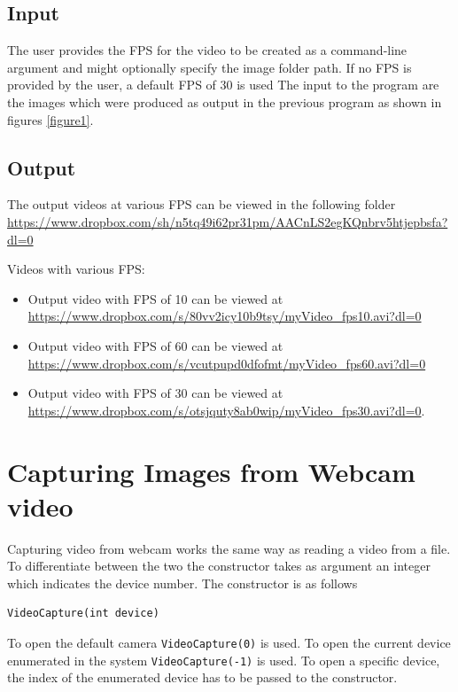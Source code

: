 \documentclass[12pt]{article}
\begin{document}
\subsection{Input}
The user provides the FPS for the video to be created as a command-line argument and might optionally specify the image folder path. If no FPS is provided by the user, a default FPS of 30 is used
The input to the program are the images which were produced as output in the previous program as shown in figures \ref{figure1}.

\subsection{Output}
The output videos at various FPS can be viewed in the following folder \url{https://www.dropbox.com/sh/n5tq49i62pr31pm/AACnLS2egKQnbrv5htjepbsfa?dl=0} 

Videos with various FPS:
\begin{itemize}
\item Output video with FPS of 10 can be viewed at \url{https://www.dropbox.com/s/80vv2icy10b9tsy/myVideo_fps10.avi?dl=0} 
\item Output video with FPS of 60 can be viewed at \url{https://www.dropbox.com/s/vcutpupd0dfofmt/myVideo_fps60.avi?dl=0}
\item Output video with FPS of 30 can be viewed at \url{https://www.dropbox.com/s/otsjquty8ab0wip/myVideo_fps30.avi?dl=0}.
\end{itemize}


\section{Capturing Images from Webcam video}
Capturing video from webcam works the same way as reading a video from a file. To differentiate between the two the constructor takes as argument an integer which indicates the device number. The constructor is as follows
\begin{verbatim}
VideoCapture(int device)
\end{verbatim}

To open the default camera \texttt{VideoCapture(0)} is used. To open the current device enumerated in the system \texttt{VideoCapture(-1)} is used. To open a specific device, the index of the enumerated device has to be passed to the constructor.
\end{document}
